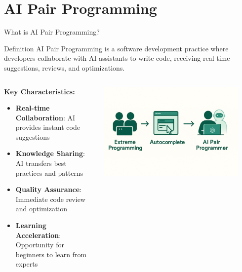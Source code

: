 \documentclass{beamer}
\begin{document}
\section{AI Pair Programming}

\begin{frame}[t]{What is AI Pair Programming?}
    \begin{block}{Definition}
        AI Pair Programming is a software development practice where developers collaborate with AI assistants to write code, receiving real-time suggestions, reviews, and optimizations.
    \end{block}
    
    \begin{columns}
        \begin{column}{0.6\textwidth}
            \textbf{Key Characteristics:}
            \begin{itemize}
                \item \textbf{Real-time Collaboration}: AI provides instant code suggestions
                \item \textbf{Knowledge Sharing}: AI transfers best practices and patterns
                \item \textbf{Quality Assurance}: Immediate code review and optimization
                \item \textbf{Learning Acceleration}: Opportunity for beginners to learn from experts
            \end{itemize}
        \end{column}
        \begin{column}{0.4\textwidth}
            \centering
            \includegraphics[width=0.9\textwidth]{images/ai-pair-programming.png}
        \end{column}
    \end{columns}
\end{frame}
\end{document}
